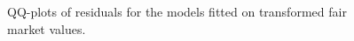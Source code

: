 \begin{figure}[h!]
\caption{QQ-plots of residuals for the models fitted on transformed fair market values.}\label{qqplot_residuals_transformed_fmv}
\end{figure}


